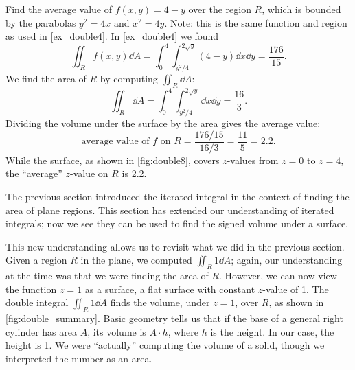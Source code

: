 \begin{example}\label{ex_double8}
Find the average value of $f(x,y) = 4-y$ over the region $R$, which is bounded by the parabolas $y^2=4x$ and $x^2=4y$. Note: this is the same function and region as used in \autoref{ex_double4}.
\solution
In \autoref{ex_double4} we found 
\[\iint_R f(x,y)\dd A = \int_0^4\int_{y^2/4}^{2\sqrt{y}}(4-y)\dd x\dd y = \frac{176}{15}.\] 
We find the area of $R$ by computing $\iint_R \dd A$:
\[\iint_R \dd A = \int_0^4\int_{y^2/4}^{2\sqrt{y}} \dd x\dd y = \frac{16}{3}.\]
%
%
%
Dividing the volume under the surface by the area gives the average value:
\[\text{average value of $f$ on $R$} = \frac{176/15}{16/3} = \frac{11}5 = 2.2.\]
While the surface, as shown in \autoref{fig:double8}, covers $z$-values from $z=0$ to $z=4$, the ``average'' $z$-value on $R$ is 2.2.
\end{example}

The previous section introduced the iterated integral in the context of finding the area of plane regions. This section has extended our understanding of iterated integrals; now we see they can be used to find the signed volume under a surface. 

This new understanding allows us to revisit what we did in the previous section. Given a region $R$ in the plane, we computed $\iint_R 1\dd A$; again, our understanding at the time was that we were finding the area of $R$. However, we can now view the function $z=1$ as a surface, a flat surface with constant $z$-value of 1. The double integral $\iint_R 1\dd A$ finds the volume, under $z=1$, over $R$, as shown in \autoref{fig:double_summary}. Basic geometry tells us that if the base of a general right cylinder has area $A$, its volume is $A\cdot h$, where $h$ is the height. In our case, the height is 1. We were ``actually'' computing the volume of a solid, though we interpreted the number as an area.


